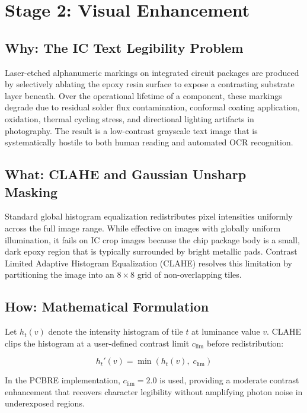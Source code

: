 \documentclass[12pt,a4paper]{report}
\begin{document}
\section{Stage 2: Visual Enhancement}
\label{sec:stage2}

\subsection{Why: The IC Text Legibility Problem}
Laser-etched alphanumeric markings on integrated circuit packages are produced by selectively ablating the epoxy resin surface to expose a contrasting substrate layer beneath. Over the operational lifetime of a component, these markings degrade due to residual solder flux contamination, conformal coating application, oxidation, thermal cycling stress, and directional lighting artifacts in photography. The result is a low-contrast grayscale text image that is systematically hostile to both human reading and automated OCR recognition.

\subsection{What: CLAHE and Gaussian Unsharp Masking}
Standard global histogram equalization redistributes pixel intensities uniformly across the full image range. While effective on images with globally uniform illumination, it fails on IC crop images because the chip package body is a small, dark epoxy region that is typically surrounded by bright metallic pads. Contrast Limited Adaptive Histogram Equalization (CLAHE) resolves this limitation by partitioning the image into an $8 \times 8$ grid of non-overlapping tiles.

\subsection{How: Mathematical Formulation}
Let $h_t(v)$ denote the intensity histogram of tile $t$ at luminance value $v$. CLAHE clips the histogram at a user-defined contrast limit $c_{\text{lim}}$ before redistribution:

\begin{equation}
\label{eq:clahe}
h_t'(v) = \min\!\left(h_t(v),\; c_{\text{lim}}\right)
\end{equation}

In the PCBRE implementation, $c_{\text{lim}} = 2.0$ is used, providing a moderate contrast enhancement that recovers character legibility without amplifying photon noise in underexposed regions.
\end{document}

